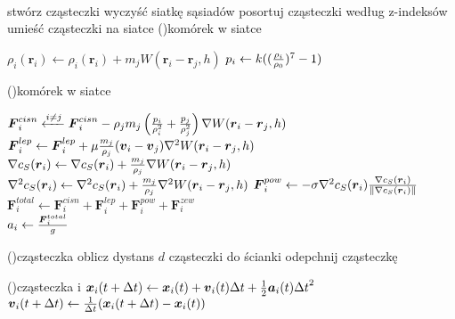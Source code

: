 \paragraph{}
{
\setlength{\interspacetitleruled}{0pt}%
\setlength{\algotitleheightrule}{0pt}%
\begin{algorithm}[H]
	stwórz cząsteczki\;
	wyczyść siatkę sąsiadów\;
	posortuj cząsteczki według z-indeksów\;
	umieść cząsteczki na siatce\;
	\ForAll(){komórek w siatce}
	{
		{
			{
				{
					$\rho_i(\boldsymbol{r}_i) \leftarrow \rho_i(\boldsymbol{r}_i) + m_j W(\boldsymbol{r}_i-\boldsymbol{r}_j, h)$
				}
			}
			$p_i \leftarrow k(({\rho_i \over \rho_0})^{7} - 1)$
		}
	
	}
	
	\ForAll(){komórek w siatce}
	{
		{
			{
				{
					$\boldsymbol{F}_i^{cisn} \xleftarrow{i \neq j} \boldsymbol{F}_i^{cisn} - \rho_j m_j \left( {p_i \over \rho_i^2} + {p_j \over \rho_j^2} \right) \nabla W(\boldsymbol{r}_i-\boldsymbol{r}_j, h)$\\
					$\boldsymbol{F}_i^{lep} \leftarrow \boldsymbol{F}_i^{lep} + \mu {m_j \over \rho_j} (\boldsymbol{v}_i - \boldsymbol{v}_j) \nabla^2 W(\boldsymbol{r}_i-\boldsymbol{r}_j, h)$\\
					$\nabla{c}_S(\boldsymbol{r}_i) \leftarrow \nabla{c}_S(\boldsymbol{r}_i) + {m_j \over \rho_j} \nabla W(\boldsymbol{r}_i-\boldsymbol{r}_j, h)$\\
					$\nabla^2{c}_S(\boldsymbol{r}_i) \leftarrow \nabla^2{c}_S(\boldsymbol{r}_i) + {m_j \over \rho_j} \nabla^2 W(\boldsymbol{r}_i-\boldsymbol{r}_j, h)$
				}
			}
			{
				$\boldsymbol{F}_i^{pow} \leftarrow -\sigma \nabla^2{c}_S(\boldsymbol{r}_i) {\nabla{c}_S(\boldsymbol{r}_i) \over \|\nabla{c}_S(\boldsymbol{r}_i)\|}$
			}
			$\boldsymbol{F}_i^{total} \leftarrow \boldsymbol{F}_i^{cisn} + \boldsymbol{F}_i^{lep} + \boldsymbol{F}_i^{pow} + \boldsymbol{F}_i^{zew}$\\
			$a_i \leftarrow {\boldsymbol{F}_i^{total} \over g}$
		}
	
	}
	
	\ForEach(){cząsteczka}
	{
		{
			oblicz dystans $d$ cząsteczki do ścianki\;
			{
				odepchnij cząsteczkę\;
			}
		}
	}
	
	\ForEach(){cząsteczka i}
	{
		$\boldsymbol{x}_i(t+\Delta t) \leftarrow \boldsymbol{x}_i(t) + \boldsymbol{v}_i(t)\Delta t + {1 \over 2}\boldsymbol{a}_i(t){\Delta t}^2$\\
		$\boldsymbol{v}_i(t+\Delta t) \leftarrow {1 \over \Delta t}(\boldsymbol{x}_i(t+\Delta t) - \boldsymbol{x}_i(t))$
	}
\end{algorithm}
}
